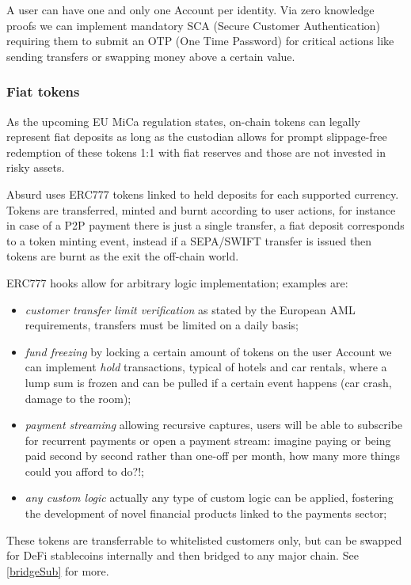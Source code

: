 \documentclass[a4paper,10 pt]{article}
\theoremstyle{definition}
\begin{document}
A user can have one and only one Account per identity. Via zero knowledge proofs we can implement mandatory SCA (Secure Customer Authentication) requiring them to submit an OTP (One Time Password) for critical actions like sending transfers or swapping money above a certain value.

\subsubsection{Fiat tokens}\label{coinsSub}
As the upcoming EU MiCa regulation states, on-chain tokens can legally represent fiat deposits as long as the custodian allows for prompt slippage-free redemption of these tokens 1:1 with fiat reserves and those are not invested in risky assets.

Absurd uses ERC777 tokens linked to held deposits for each supported currency.
Tokens are transferred, minted and burnt according to user actions, for instance in case of a P2P payment there is just a single transfer, a fiat deposit corresponds to a token minting event, instead if a SEPA/SWIFT transfer is issued then tokens are burnt as the exit the off-chain world.

ERC777 hooks allow for arbitrary logic implementation; examples are:
\begin{itemize}
\item{\textit{customer transfer limit verification}} as stated by the European AML requirements, transfers must be limited on a daily basis;
\item{\textit{fund freezing}} by locking a certain amount of tokens on the user Account we can implement \textit{hold} transactions, typical of hotels and car rentals, where a lump sum is frozen and can be pulled if a certain event happens (car crash, damage to the room);
\item{\textit{payment streaming}} allowing recursive captures, users will be able to subscribe for recurrent payments or open a payment stream: imagine paying or being paid second by second rather than one-off per month, how many more things could you afford to do?!;
\item{\textit{any custom logic}} actually any type of custom logic can be applied, fostering the development of novel financial products linked to the payments sector;
\end{itemize}

These tokens are transferrable to whitelisted customers only, but can be swapped for DeFi stablecoins internally and then bridged to any major chain. See \ref{bridgeSub} for more.
\end{document}

